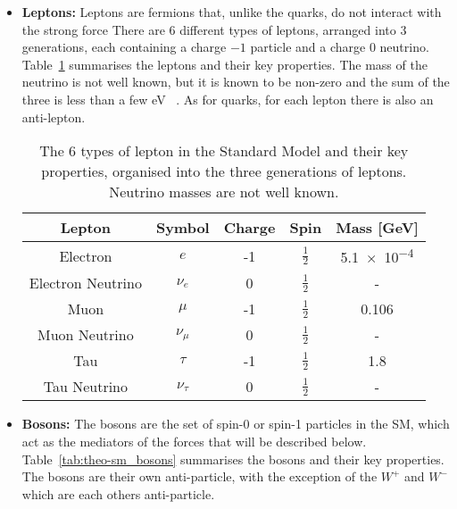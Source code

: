 \begin{itemize}[leftmargin=*]
\item\textbf{Leptons:}
  Leptons are fermions that, unlike the quarks, do not interact with the strong force
  There are 6 different types of leptons,
  arranged into  3 generations, each containing a charge $-1$ particle and a charge 0 neutrino.
  Table~\ref{tab:theo-sm_leptons} summarises the leptons and their key properties.
  The mass of the neutrino is not well known, but it is known to be non-zero and the sum of the three is less than a few eV ~\cite{theo-nu_mass}.
  As for quarks, for each lepton there is also an anti-lepton.
\newpage
  {\renewcommand{\arraystretch}{1.5}
  \begin{table}[!ht]
  \begin{center}
    \begin{tabular}{|c||c|c|c|c|}
      \hline
    Lepton            & Symbol        & Charge  &  Spin           &  Mass [GeV]\\
    \hline
    Electron          &   $e$         &  -1    &  $\frac{1}{2}$   &  \num{5.1e-4}\\
    Electron Neutrino &   $\nu_e$     &  0     &  $\frac{1}{2}$   &  -\\
    \hline                                   
    Muon              &   $\mu$       &  -1    &  $\frac{1}{2}$   &  0.106 \\
    Muon Neutrino     &   $\nu_{\mu}$  &  0     &  $\frac{1}{2}$   &  -\\
    \hline                                      
    Tau               &   $\tau$       &  -1   &  $\frac{1}{2}$   &  1.8\\
    Tau Neutrino      &   $\nu_{\tau}$  &  0    &  $\frac{1}{2}$   &  -\\
    \hline  
  \end{tabular}
    \caption{The 6 types of lepton in the Standard Model and their key properties,
    organised into the three generations of leptons. Neutrino masses are not well known. }
  \label{tab:theo-sm_leptons}
  \end{center}
  \end{table}}
 
\item\textbf{Bosons:}
  The bosons are the set of spin-0 or spin-1 particles in the SM,
  which act as the mediators of the forces that will be described below.
  Table~\ref{tab:theo-sm_bosons} summarises the bosons and their key properties.
  The bosons are their own anti-particle, with the exception of the $W^{+}$ and $W^{-}$
  which are each others anti-particle.


\end{itemize}
